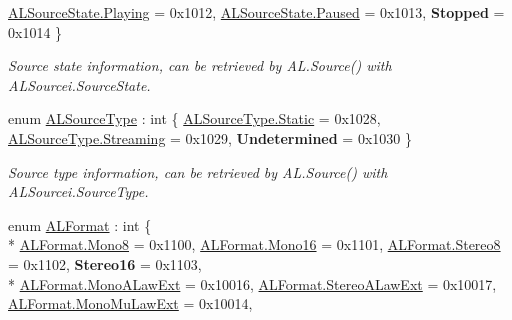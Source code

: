 \begin{DoxyCompactItemize}
\hyperlink{namespace_open_t_k_1_1_audio_1_1_open_a_l_a5b2a6fe6458bb334071d8246600865ccac9dbb2b7c84159b632d71e512eba8428}{A\-L\-Source\-State.\-Playing} = 0x1012, 
\hyperlink{namespace_open_t_k_1_1_audio_1_1_open_a_l_a5b2a6fe6458bb334071d8246600865ccae99180abf47a8b3a856e0bcb2656990a}{A\-L\-Source\-State.\-Paused} = 0x1013, 
{\bfseries Stopped} = 0x1014
 \}
\begin{DoxyCompactList}\small\item\em Source state information, can be retrieved by A\-L.\-Source() with A\-L\-Sourcei.\-Source\-State.\end{DoxyCompactList}\item 
enum \hyperlink{namespace_open_t_k_1_1_audio_1_1_open_a_l_a99cd08a933ac25c29be4107324d00e2d}{A\-L\-Source\-Type} \-: int \{ \hyperlink{namespace_open_t_k_1_1_audio_1_1_open_a_l_a99cd08a933ac25c29be4107324d00e2da84a8921b25f505d0d2077aeb5db4bc16}{A\-L\-Source\-Type.\-Static} = 0x1028, 
\hyperlink{namespace_open_t_k_1_1_audio_1_1_open_a_l_a99cd08a933ac25c29be4107324d00e2daac21d502848247aa2f578d0f718f5d1d}{A\-L\-Source\-Type.\-Streaming} = 0x1029, 
{\bfseries Undetermined} = 0x1030
 \}
\begin{DoxyCompactList}\small\item\em Source type information, can be retrieved by A\-L.\-Source() with A\-L\-Sourcei.\-Source\-Type.\end{DoxyCompactList}\item 
enum \hyperlink{namespace_open_t_k_1_1_audio_1_1_open_a_l_a4223e02452abfb5070f9b9bf1d426ffc}{A\-L\-Format} \-: int \{ \\*
\hyperlink{namespace_open_t_k_1_1_audio_1_1_open_a_l_a4223e02452abfb5070f9b9bf1d426ffcabc5c44624758954f1a4af1e009f5cf6e}{A\-L\-Format.\-Mono8} = 0x1100, 
\hyperlink{namespace_open_t_k_1_1_audio_1_1_open_a_l_a4223e02452abfb5070f9b9bf1d426ffcaab2f4f7e4448e8c91c89774787a1cc2c}{A\-L\-Format.\-Mono16} = 0x1101, 
\hyperlink{namespace_open_t_k_1_1_audio_1_1_open_a_l_a4223e02452abfb5070f9b9bf1d426ffcac6b222ce6dafa010da034571a80c21f3}{A\-L\-Format.\-Stereo8} = 0x1102, 
{\bfseries Stereo16} = 0x1103, 
\\*
\hyperlink{namespace_open_t_k_1_1_audio_1_1_open_a_l_a4223e02452abfb5070f9b9bf1d426ffcaacde8641368da1d48b6a689f887ae2c0}{A\-L\-Format.\-Mono\-A\-Law\-Ext} = 0x10016, 
\hyperlink{namespace_open_t_k_1_1_audio_1_1_open_a_l_a4223e02452abfb5070f9b9bf1d426ffcad4c2b894c20d4e2e98f0655b7e7d477e}{A\-L\-Format.\-Stereo\-A\-Law\-Ext} = 0x10017, 
\hyperlink{namespace_open_t_k_1_1_audio_1_1_open_a_l_a4223e02452abfb5070f9b9bf1d426ffcaad897133f1fd5197293eb2e114ec28e3}{A\-L\-Format.\-Mono\-Mu\-Law\-Ext} = 0x10014, 

\end{DoxyCompactItemize}
